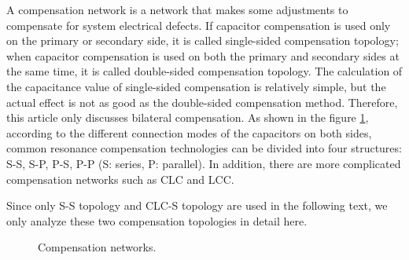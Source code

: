 A compensation network is a network that makes some adjustments to compensate for system electrical defects. If capacitor compensation is used only on the primary or secondary side, it is called single-sided compensation topology; when capacitor compensation is used on both the primary and secondary sides at the same time, it is called double-sided compensation topology. The calculation of the capacitance value of single-sided compensation is relatively simple, but the actual effect is not as good as the double-sided compensation method. Therefore, this article only discusses bilateral compensation. As shown in the figure \ref{compensation network}, according to the different connection modes of the capacitors on both sides, common resonance compensation technologies can be divided into four structures: S-S, S-P, P-S, P-P (S: series, P: parallel). In addition, there are more complicated compensation networks such as CLC and LCC.

Since only S-S topology and CLC-S topology are used in the following text, we only analyze these two compensation topologies in detail here.
\begin{figure}
    \centering
    \caption{Compensation networks.}
    \label{compensation network}
\end{figure}


